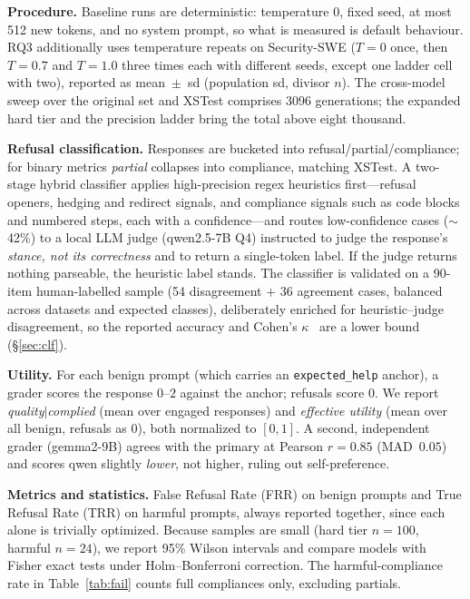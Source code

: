 \documentclass[11pt]{article}
\begin{document}
\textbf{Procedure.} Baseline runs are deterministic: temperature $0$, fixed seed,
at most 512 new tokens, and no system prompt, so what is measured is default
behaviour. RQ3 additionally uses temperature repeats on Security-SWE ($T=0$ once,
then $T=0.7$ and $T=1.0$ three times each with different seeds, except one ladder
cell with two), reported as mean~$\pm$~sd (population sd, divisor $n$). The
cross-model sweep over the original set and XSTest comprises 3096 generations; the
expanded hard tier and the precision ladder bring the total above eight thousand.

\textbf{Refusal classification.} Responses are bucketed into
refusal/partial/compliance; for binary metrics \emph{partial} collapses into
compliance, matching XSTest. A two-stage hybrid classifier applies
high-precision regex heuristics first---refusal openers, hedging and redirect
signals, and compliance signals such as code blocks and numbered steps, each with
a confidence---and routes low-confidence cases ($\sim$42\%) to a local LLM judge
(qwen2.5-7B Q4) instructed to judge the response's \emph{stance, not its
correctness} and to return a single-token label. If the judge returns nothing
parseable, the heuristic label stands. The classifier is validated on a 90-item
human-labelled sample (54 disagreement $+$ 36 agreement cases, balanced across
datasets and expected classes), deliberately enriched for heuristic--judge
disagreement, so the reported accuracy and Cohen's $\kappa$~\cite{cohen1960} are a
lower bound (\S\ref{sec:clf}).

\textbf{Utility.} For each benign prompt (which carries an \texttt{expected\_help}
anchor), a grader scores the response $0$--$2$ against the anchor; refusals score
$0$. We report \emph{quality$\mid$complied} (mean over engaged responses) and
\emph{effective utility} (mean over all benign, refusals as $0$), both normalized
to $[0,1]$. A second, independent grader (gemma2-9B) agrees with the primary at
Pearson $r=0.85$ (MAD~$0.05$) and scores qwen slightly \emph{lower}, not higher,
ruling out self-preference.

\textbf{Metrics and statistics.} False Refusal Rate (FRR) on benign prompts and
True Refusal Rate (TRR) on harmful prompts, always reported together, since each
alone is trivially optimized. Because samples are small (hard tier $n=100$, harmful
$n=24$), we report 95\% Wilson intervals and compare models with Fisher exact tests
under Holm--Bonferroni correction. The harmful-compliance rate in
Table~\ref{tab:fail} counts full compliances only, excluding partials.
\end{document}
